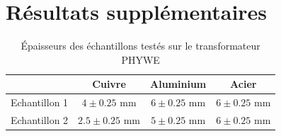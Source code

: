 \section{Résultats supplémentaires}
\label{sec:resultats_bonus}

\begin{table}[h]
    \centering
    \begin{tabulary}{\linewidth}{c c c c}
        \toprule
         & Cuivre & Aluminium & Acier \\
        \midrule
        Echantillon 1 & \(4 \pm 0.25\) \si{\milli\meter} & \(6 \pm 0.25\) \si{\milli\meter} & \(6 \pm 0.25\) \si{\milli\meter}\\
        Echantillon 2 & \(2.5 \pm 0.25\) \si{\milli\meter} & \(5 \pm 0.25\) \si{\milli\meter} & \(6 \pm 0.25\) \si{\milli\meter} \\
        \bottomrule
    \end{tabulary}
    \caption{Épaisseurs des échantillons testés sur le transformateur PHYWE}
    \label{tab:thiccness}
\end{table}

